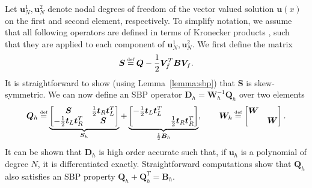 \documentclass[onefignum,onetabnum,final]{siamart171218}
\newcommand\myeq{\mathrel{\stackrel{\makebox[0pt]{\mbox{\normalfont\tiny def}}}{=}}}
\begin{document}
Let $\bm{u}^1_N, \bm{u}^2_N$ denote nodal degrees of freedom of the vector valued solution $\bm{u}(x)$ on the first and second element, respectively.  To simplify notation, we assume that all following operators are defined in terms of Kronecker products \cite{chen2017entropy}, such that they are applied to each component of $\bm{u}^1_N, \bm{u}^2_N$.  
We first define the matrix 
\begin{equation}
\bm{S} \myeq \bm{Q} - \frac{1}{2}\bm{V}_f^T\bm{B}\bm{V}_f.
\label{eq:Smat}
\end{equation}
It is straightforward to show (using Lemma~\ref{lemma:sbp}) that $\bm{S}$ is skew-symmetric.  We can now define an SBP operator $\bm{D}_h = \bm{W}_h^{-1}\bm{Q}_h$ over two elements
\begin{equation}
\bm{Q}_{h} \myeq 
\underbrace{\begin{bmatrix}
\bm{S}  & \frac{1}{2}\bm{t}_R\bm{t}_L^T \\
- \frac{1}{2}\bm{t}_L\bm{t}_R^T & \bm{S}
\end{bmatrix}}_{\bm{S}_h}
+
\underbrace{\begin{bmatrix}
-\frac{1}{2}\bm{t}_L\bm{t}_L^T  & \\
 & \frac{1}{2} \bm{t}_R\bm{t}_R^T
\end{bmatrix}}_{\frac{1}{2}\bm{B}_h}
, \qquad 
\bm{W}_h \myeq \begin{bmatrix}\bm{W} &\\
& \bm{W}
\end{bmatrix}.
\label{eq:gsbp}
\end{equation}
It can be shown that $\bm{D}_h$ is high order accurate such that, if $\bm{u}_h$ is a polynomial of degree $N$, it is differentiated exactly.  Straightforward computations show that $\bm{Q}_h$ also satisfies an SBP property $\bm{Q}_h + \bm{Q}_h^T = \bm{B}_h$.
\end{document}
